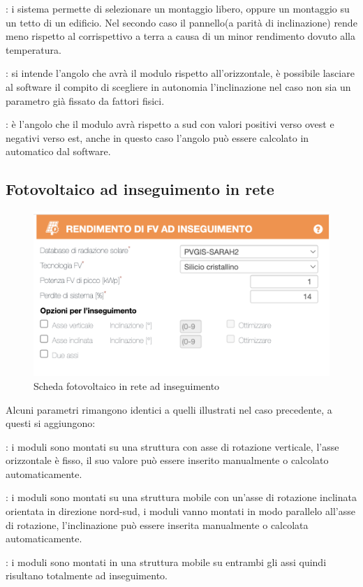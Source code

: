 \begin{description}[labelindent=5mm]
    \item[$\bullet$ Posizione di montaggio]: i sistema permette di selezionare un montaggio libero, oppure un montaggio su un tetto di un edificio. Nel secondo caso il pannello(a parità di inclinazione) rende meno rispetto al corrispettivo a terra a causa di un minor rendimento dovuto alla temperatura.
    \item[$\bullet$ Inclinazione]: si intende l'angolo che avrà il modulo rispetto all'orizzontale, è possibile lasciare al software il compito di scegliere in autonomia l'inclinazione nel caso non sia un parametro già fissato da fattori fisici.
    \item[$\bullet$ Orientamento]: è l'angolo che il modulo avrà rispetto a sud con valori positivi verso ovest e negativi verso est, anche in questo caso l'angolo può essere calcolato in automatico dal software.
\end{description}

\subsection{Fotovoltaico ad inseguimento in rete}
\begin{figure}[H]
    \centering
    \includegraphics[height=0.5\textwidth]{res/cap 4/moduli ad inseguimento}
    \caption{Scheda fotovoltaico in rete ad inseguimento}
\end{figure}\noindent
Alcuni parametri rimangono identici a quelli illustrati nel caso precedente, a questi si aggiungono:
\begin{description}[labelindent=5mm]
    \item[$\bullet$ Asse verticale]: i moduli sono montati su una struttura con asse di rotazione verticale, l'asse orizzontale è fisso, il suo valore può essere inserito manualmente o calcolato automaticamente.
    \item[$\bullet$ Asse inclinata]: i moduli sono montati su una struttura mobile con un'asse di rotazione inclinata orientata in direzione nord-sud, i moduli vanno montati in modo parallelo all'asse di rotazione, l'inclinazione può essere inserita manualmente o calcolata automaticamente.
    \item[$\bullet$ Due assi]: i moduli sono montati in una struttura mobile su entrambi gli assi quindi risultano totalmente ad inseguimento.
\end{description}
